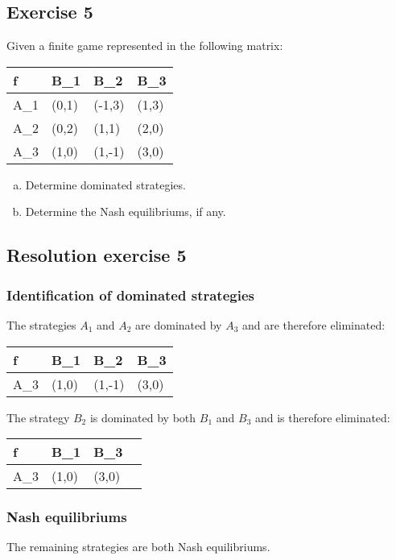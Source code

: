 \documentclass[\main/main.tex]{subfiles}
\begin{document}
\subsection{Exercise 5}
Given a finite game represented in the following matrix:

\begin{table}
  \begin{tabular}{L|LLL}
    f   & B_1   & B_2    & B_3   \\
    \hline
    A_1 & (0,1) & (-1,3) & (1,3) \\
    A_2 & (0,2) & (1,1)  & (2,0) \\
    A_3 & (1,0) & (1,-1) & (3,0) \\
  \end{tabular}
\end{table}

\begin{enumerate}[a)]
  \item Determine dominated strategies.
  \item Determine the Nash equilibriums, if any.
\end{enumerate}

\subsection{Resolution exercise 5}
\subsubsection*{Identification of dominated strategies}

The strategies $A_1$ and $A_2$ are dominated by $A_3$ and are therefore eliminated:

\begin{table}
  \begin{tabular}{L|LLL}
    f   & B_1   & B_2    & B_3   \\
    \hline
    A_3 & (1,0) & (1,-1) & (3,0) \\
  \end{tabular}
\end{table}

The strategy $B_2$ is dominated by both $B_1$ and $B_3$ and is therefore eliminated:

\begin{table}
  \begin{tabular}{L|LLL}
    f   & B_1   & B_3   \\
    \hline
    A_3 & (1,0) & (3,0) \\
  \end{tabular}
\end{table}

\subsubsection*{Nash equilibriums}
The remaining strategies are both Nash equilibriums.
\end{document}
